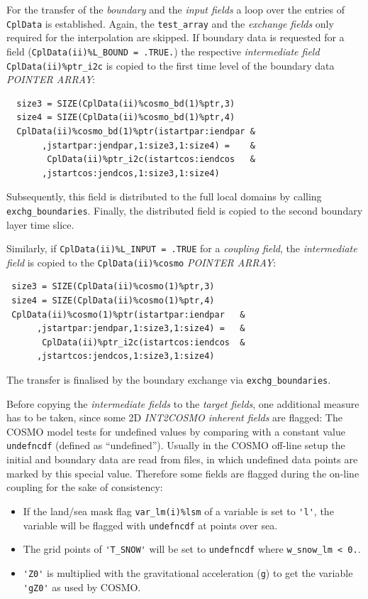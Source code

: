 \documentclass[11pt,twoside]{article}
\begin{document}
\begin{enumerate}
\begin{itemize}
For the transfer of the {\it boundary} and the {\it input fields} a loop over 
the entries of \verb|CplData| is established. 
Again, the \verb|test_array| and the {\it exchange fields} only required for the
interpolation are skipped.
If boundary data is requested for a field (\verb|CplData(ii)%L_BOUND = .TRUE.|)
the respective {\it intermediate field}
 \verb|CplData(ii)%ptr_i2c| is copied to the first 
time level of the boundary data {\footnotesize \it POINTER ARRAY}:
\begin{verbatim}
  size3 = SIZE(CplData(ii)%cosmo_bd(1)%ptr,3)
  size4 = SIZE(CplData(ii)%cosmo_bd(1)%ptr,4)
  CplData(ii)%cosmo_bd(1)%ptr(istartpar:iendpar &
       ,jstartpar:jendpar,1:size3,1:size4) =    &
        CplData(ii)%ptr_i2c(istartcos:iendcos   &
       ,jstartcos:jendcos,1:size3,1:size4)
\end{verbatim}
Subsequently, this field is distributed to the full local domains by calling
\verb|exchg_boundaries|.
Finally, the distributed field is copied to the second boundary layer time
slice. 

Similarly, if \verb|CplData(ii)%L_INPUT = .TRUE| for a {\it coupling field}, the
{\it intermediate field} is copied to the \verb|CplData(ii)%cosmo| 
{\footnotesize \it POINTER ARRAY}:
\begin{verbatim}
 size3 = SIZE(CplData(ii)%cosmo(1)%ptr,3)
 size4 = SIZE(CplData(ii)%cosmo(1)%ptr,4)
 CplData(ii)%cosmo(1)%ptr(istartpar:iendpar   &
      ,jstartpar:jendpar,1:size3,1:size4) =   &
       CplData(ii)%ptr_i2c(istartcos:iendcos  &
      ,jstartcos:jendcos,1:size3,1:size4)
\end{verbatim}
The transfer is finalised by the boundary exchange via \verb|exchg_boundaries|.
\end{itemize} %

Before copying the {\it intermediate fields} to the {\it target fields}, one
 additional
measure has to be taken, since some 2D {\it INT2COSMO inherent fields}
are flagged: The COSMO model tests for undefined values by comparing 
with a constant value \verb|undefncdf| (defined as ``undefined'').  
Usually in the COSMO off-line setup the initial and boundary data are read 
from files, in which undefined data points are marked by this special value. 
Therefore some fields are flagged during the on-line coupling for the sake 
of consistency:
\begin{itemize}
\item If the land/sea mask flag \verb|var_lm(i)%lsm| of a variable is set to 
\verb|'l'|,
the variable will be flagged with \verb|undefncdf| at points over sea.
\item  The grid points of \verb|'T_SNOW'| will be set to \verb|undefncdf| where
\verb|w_snow_lm < 0.|.
\item \verb|'Z0'| is multiplied with the gravitational acceleration (\verb|g|)
to get the variable \verb|'gZ0'| as used by COSMO.
\end{itemize}


\end{enumerate} %
\end{document}
